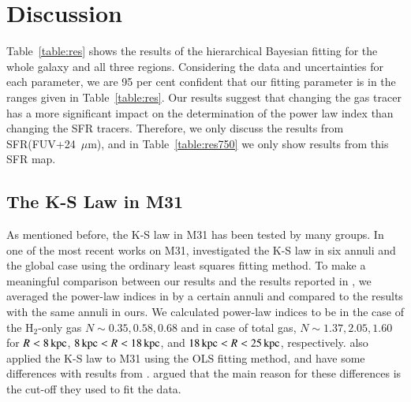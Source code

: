 %
\section{Discussion}

Table~\ref{table:res} shows the results of the hierarchical Bayesian fitting for the whole galaxy and all three regions. Considering the data and uncertainties for each parameter, we are 95 per cent confident that our fitting parameter is in the ranges given in Table~\ref{table:res}.
Our results suggest that changing the gas tracer has a more significant impact on the determination of the power law index than changing the SFR tracers. Therefore, we only discuss the results from SFR(FUV+24~$\mu$m), and in Table~\ref{table:res750} we only show results from this SFR map.

\subsection{The K-S Law in M31}

As mentioned before, the K-S law in M31 has been tested by many groups. In one of the most recent works on M31, \citet{Ford13} investigated the K-S law in six annuli and the global case using the ordinary least squares fitting method. 
To make a meaningful comparison between our results and the results reported in \citet{Ford13}, we averaged the power-law indices in \citet{Ford13} by a certain annuli and compared to the results with the same annuli in ours. We calculated power-law indices to be in the case of the H$_{2}$-only gas $N \sim 0.35, 0.58, 0.68$ and in case of total gas, $N \sim 1.37, 2.05, 1.60$ for $R< 8\,{\rm kpc}$, $8\,{\rm kpc} < R < 18\,{\rm kpc}$, and $18\,{\rm kpc} < R < 25\,{\rm kpc}$, respectively.
\citet{Tabatabaei10} also applied the K-S law to M31 using the OLS fitting method, and have some differences with results from \citet{Ford13}. \citet{Ford13} argued that the main reason for these differences is the cut-off they used to fit the data. 
 
